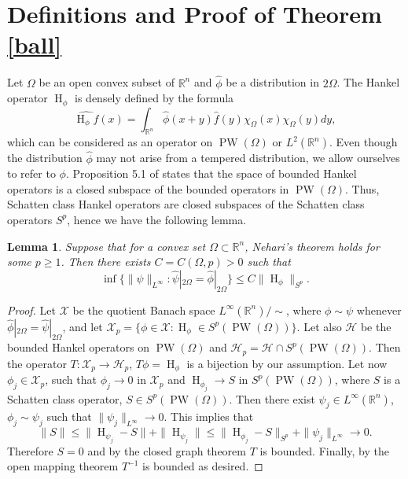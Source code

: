 \documentclass[footinclude=true]{amsart}
\theoremstyle{plain}
\newtheorem{lm}[theo]{Lemma}
\DeclareMathOperator{\Ha}{H}
\DeclareMathOperator{\PW}{PW}
\begin{document}
	\section{Definitions and Proof of Theorem \ref{ball}}\label{sec2}
	Let $\Omega$ be an open convex subset of $\mathbb{R}^{n}$ and $\widehat{\phi}$ be a distribution in $2\Omega$. The Hankel operator $\Ha_{\phi}$ is densely defined by the formula 
	$$\widehat{\Ha_{\phi}f}(x)=\int_{\mathbb{R}^n}\widehat{\phi}(x+y)\widehat{f}(y)\chi_{\Omega}(x)\chi_{\Omega}(y)dy,$$ which can be considered as an operator on $\PW(\Omega)$ or $L^2(\mathbb{R}^n)$. Even though the distribution $\widehat{\phi}$ may not arise from a tempered distribution, we allow ourselves to refer to $\phi$. Proposition 5.1 of \cite{MR4227573} states that the space of bounded Hankel operators is a closed subspace of the bounded operators in $\PW(\Omega)$. Thus, Schatten class Hankel operators are closed subspaces of the Schatten class operators $S^{p}$, hence we have the following lemma. 
	\begin{lm}\label{implNehari}
		Suppose that for a convex set $\Omega\subset\mathbb{R}^{n}$, Nehari's theorem holds for some $p\geq 1$. Then there exists $C=C(\Omega,p)>0$ such that 
		$$\inf\{\|\psi\|_{L^{\infty}}:\widehat{\psi}|_{2\Omega}=\widehat{\phi}|_{2\Omega}\}\leq C\|\Ha_{\phi}\|_{S^{p}}.$$
	\end{lm}
	\begin{proof}
		Let $\mathcal{X}$ be the quotient Banach space $L^{\infty}(\mathbb{R}^{n})/\sim$, where $\phi\sim\psi$ whenever $\widehat{\phi}|_{2\Omega}=\widehat{\psi}|_{2\Omega}$, and let $\mathcal{X}_{p}=\{\phi\in \mathcal{X}:\Ha_{\phi}\in S^{p}(\PW(\Omega))\}$. Let also $\mathcal{H}$ be the bounded Hankel operators on $\PW(\Omega)$ and $\mathcal{H}_{p}=\mathcal{H}\cap S^{p}(\PW(\Omega))$. Then the operator $T:\mathcal{X}_{p}\to\mathcal{H}_{p}$, $T\phi=\Ha_{\phi}$ is a bijection by our assumption. Let now $\phi_{j}\in \mathcal{X}_{p}$, such that $\phi_{j}\to 0$ in $\mathcal{X}_{p}$ and $\Ha_{\phi_{j}}\to S$ in $S^{p}(\PW(\Omega))$, where $S$ is a Schatten class operator, $S\in S^{p}(\PW(\Omega))$. Then there exist $\psi_{j}\in L^{\infty}(\mathbb{R}^{n})$, $\phi_{j}\sim\psi_{j}$ such that $\|\psi_{j}\|_{L^{\infty}}\to 0$. This implies that
		$$\|S\|\leq \|\Ha_{\psi_{j}}-S\|+\|\Ha_{\psi_{j}}\|\leq \|\Ha_{\phi_{j}}-S\|_{S^{p}}+\|\psi_{j}\|_{L^{\infty}}\to 0.$$
		Therefore $S=0$ and by the closed graph theorem $T$ is bounded. Finally, by the open mapping theorem $T^{-1}$ is bounded as desired.
	\end{proof}
\end{document}
